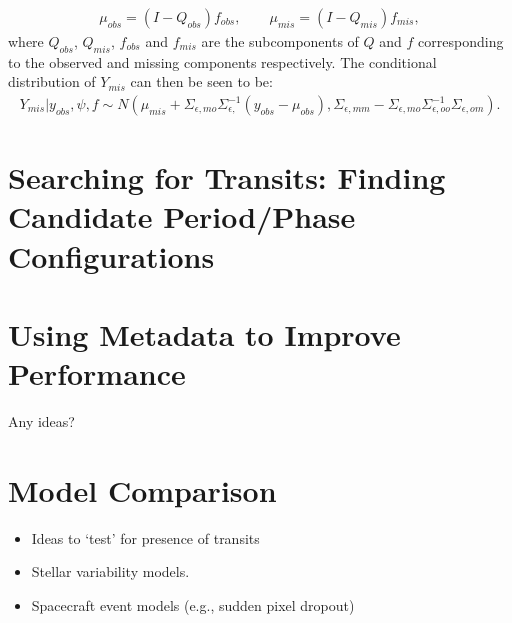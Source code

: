 \documentclass[a4paper,11pt]{article}
\begin{document}
\begin{align*}
\mu_{obs} = (I-Q_{obs})f_{obs} , \qquad \mu_{mis} = (I-Q_{mis})f_{mis} ,
\end{align*}
where $Q_{obs}$, $Q_{mis}$, $f_{obs}$ and $f_{mis}$ are the subcomponents of $Q$ and $f$ corresponding to the observed and missing components respectively. The conditional distribution of $Y_{mis}$ can then be seen to be: 
\begin{align*}
 Y_{mis} | y_{obs}, \psi, f \sim N\left( \mu_{mis} + \Sigma_{\epsilon,mo}\Sigma_{\epsilon,}^{-1}(y_{obs}-\mu_{obs}), \Sigma_{\epsilon,mm} - \Sigma_{\epsilon,mo}\Sigma_{\epsilon,oo}^{-1}\Sigma_{\epsilon,om} \right) .
\end{align*} 


\section{Searching for Transits: Finding Candidate Period/Phase Configurations}

\section{Using Metadata to Improve Performance}
Any ideas?

\section{Model Comparison}
\begin{itemize}
\item Ideas to \lq{}test\rq{} for presence of transits
\item Stellar variability models. 
\item Spacecraft event models (e.g., sudden pixel dropout)
\end{itemize}
\end{document}
